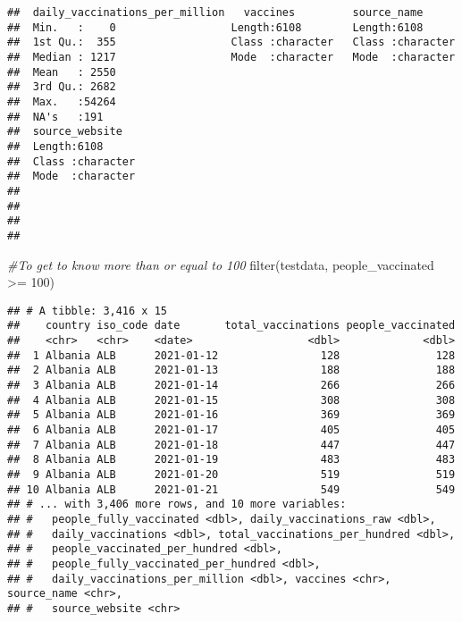 \documentclass[
]{article}
\newenvironment{Shaded}{\begin{snugshade}}{\end{snugshade}}
\newcommand{\CommentTok}[1]{\textcolor[rgb]{0.56,0.35,0.01}{\textit{#1}}}
\newcommand{\DecValTok}[1]{\textcolor[rgb]{0.00,0.00,0.81}{#1}}
\newcommand{\FunctionTok}[1]{\textcolor[rgb]{0.00,0.00,0.00}{#1}}
\newcommand{\NormalTok}[1]{#1}
\newcommand{\SpecialCharTok}[1]{\textcolor[rgb]{0.00,0.00,0.00}{#1}}
\begin{document}
\begin{verbatim}
##  daily_vaccinations_per_million   vaccines         source_name       
##  Min.   :    0                  Length:6108        Length:6108       
##  1st Qu.:  355                  Class :character   Class :character  
##  Median : 1217                  Mode  :character   Mode  :character  
##  Mean   : 2550                                                       
##  3rd Qu.: 2682                                                       
##  Max.   :54264                                                       
##  NA's   :191                                                         
##  source_website    
##  Length:6108       
##  Class :character  
##  Mode  :character  
##                    
##                    
##                    
## 
\end{verbatim}

\begin{Shaded}
\begin{Highlighting}[]
\CommentTok{\#To get to know more than or equal to 100  }
\FunctionTok{filter}\NormalTok{(testdata, people\_vaccinated }\SpecialCharTok{\textgreater{}=} \DecValTok{100}\NormalTok{)}
\end{Highlighting}
\end{Shaded}

\begin{verbatim}
## # A tibble: 3,416 x 15
##    country iso_code date       total_vaccinations people_vaccinated
##    <chr>   <chr>    <date>                  <dbl>             <dbl>
##  1 Albania ALB      2021-01-12                128               128
##  2 Albania ALB      2021-01-13                188               188
##  3 Albania ALB      2021-01-14                266               266
##  4 Albania ALB      2021-01-15                308               308
##  5 Albania ALB      2021-01-16                369               369
##  6 Albania ALB      2021-01-17                405               405
##  7 Albania ALB      2021-01-18                447               447
##  8 Albania ALB      2021-01-19                483               483
##  9 Albania ALB      2021-01-20                519               519
## 10 Albania ALB      2021-01-21                549               549
## # ... with 3,406 more rows, and 10 more variables:
## #   people_fully_vaccinated <dbl>, daily_vaccinations_raw <dbl>,
## #   daily_vaccinations <dbl>, total_vaccinations_per_hundred <dbl>,
## #   people_vaccinated_per_hundred <dbl>,
## #   people_fully_vaccinated_per_hundred <dbl>,
## #   daily_vaccinations_per_million <dbl>, vaccines <chr>, source_name <chr>,
## #   source_website <chr>
\end{verbatim}
\end{document}
